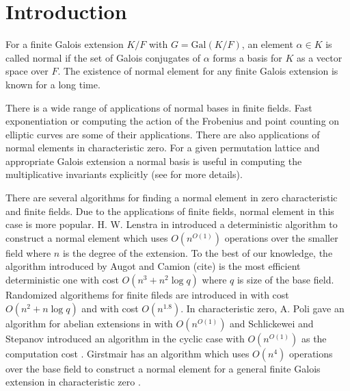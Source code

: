 \documentclass[sigconf]{acmart}
\theoremstyle{acmplain}
\begin{document}
%
%


\maketitle

\section{Introduction}

For a finite Galois extension $K/F$ with $G = \mathrm{Gal}(K/F)$, an element $\alpha \in K$
is called normal if the set of Galois conjugates of $\alpha$ forms a basis for $K$ as a
 vector space over $F$. The existence of normal element for any finite Galois extension is 
 known for a long time.
 
There is a wide range of applications of normal bases in finite fields. Fast exponentiation 
or computing the action of the Frobenius and point counting on elliptic curves are some of their applications. There are also 
applications of normal elements in characteristic zero. For a given permutation lattice and appropriate Galois extension
a normal basis is useful in computing the multiplicative invariants explicitly (see \cite{Armin} for more details).   

There are several algorithms for finding a normal element in zero characteristic and finite fields. Due to the applications of
finite fields, normal element in this case is more popular. H. W. Lenstra in \cite{LenstraNormal} introduced a deterministic 
algorithm to construct a normal element which uses $O(n^{O(1)})$ operations over the smaller field where $n$ is the degree of the
 extension. To the best of
our knowledge, the algorithm introduced by Augot and Camion (cite) is the most efficient deterministic one with cost 
$O(n^3+n^2\log q)$
where $q$ is size of the base field. Randomized algorithems for finite fileds are introduced in \cite{Giesbrecht} with cost
$O(n^2+n\log q)$ and \cite{Kaltofen} with cost $O(n^{1.8})$. In characteristic zero, A. Poli gave an algorithm for abelian extensions in \cite{Poli} with $O(n^{O(1)})$ and Schlickewei and Stepanov introduced an algorithm in the cyclic case with
$O(n^{O(1)})$ as the computation cost \cite{Stepanov}. Girstmair has an algorithm which uses $O(n^4)$ operations over the base field to construct a normal element for a general finite Galois extension in characteristic zero \cite{Girstmair}. 
\end{document}
